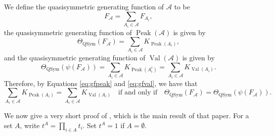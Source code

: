 \documentclass[12pt]{amsart}
\numberwithin{equation}{section}
\newcommand{\QSym}{\mathrm{QSym}}
\begin{document}
We define the quasisymmetric generating function of $\mathcal{A}$ to be
\[
F_{\mathcal{A}} = \sum_{A_i \in \mathcal{A}} F_{A_i},
\]
 the quasisymmetric generating function of $\operatorname{Peak}(\mathcal{A})$ is given by
\begin{equation}\label{eq:gfpeak}
\Theta_{\QSym}(F_{\mathcal{A}}) = \sum_{A_i \in \mathcal{A}} K_{\operatorname{Peak}(A_i)},
\end{equation}
and the quasisymmetric generating function of $\operatorname{Val}(\mathcal{A})$ is given by
\begin{equation}\label{eq:gfval}
\Theta_{\QSym}(\psi(F_{\mathcal{A}})) = \sum_{A_i \in \mathcal{A}} K_{\operatorname{Peak}(A_i^c)} = \sum_{A_i \in \mathcal{A}} K_{\operatorname{Val}(A_i)}.
\end{equation}
Therefore, by Equations \eqref{eq:gfpeak} and \eqref{eq:gfval}, we have that 
$$\sum_{A_i \in \mathcal{A}} K_{\operatorname{Peak}(A_i)}=\sum_{A_i \in \mathcal{A}} K_{\operatorname{Val}(A_i)}\quad\text{if and only if}\quad \Theta_{\QSym}(F_{\mathcal{A}}) = \Theta_{\QSym}(\psi(F_{\mathcal{A}})).$$




We now give a very short proof of \cite[Theorem 1.1]{Z24}, which is the main result of that paper. 
For a set $A$, write $t^A=\prod_{i\in A} t_i$. Set $t^{A}=1$ if $A=\emptyset$.  
\end{document}
